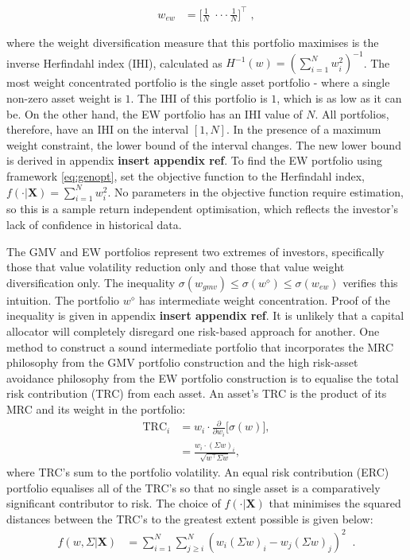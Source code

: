 \documentclass[
]{article}
\begin{document}
\begin{align}
w_{ew} & = \Big [\frac{1}{N} \; \cdot \cdot \cdot \frac{1}{N} \Big ]^\intercal \; ,
\end{align}

where the weight diversification measure that this portfolio maximises is the inverse Herfindahl index
(IHI), calculated as \(H^{-1} (w) = (\sum_{i = 1}^N w_i^2)^{-1}\). The most weight concentrated
portfolio is the single asset portfolio - where a single non-zero asset weight is \(1\). The IHI of this
portfolio is \(1\), which is as low as it can be. On the other hand, the EW portfolio has an IHI value
of \(N\). All portfolios, therefore, have an IHI on the interval \([1, N]\). In the presence of a maximum
weight constraint, the lower bound of the interval changes. The new lower bound is derived in appendix
\textbf{insert appendix ref}. To find the EW portfolio using framework \eqref{eq:genopt}, set the objective
function to the Herfindahl index, \(f(\cdot|\textbf{X}) = \sum_{i = 1}^N w_i^2\). No parameters in the
objective function require estimation, so this is a sample return independent optimisation, which
reflects the investor's lack of confidence in historical data.

The GMV and EW portfolios represent two extremes of investors, specifically those that value
volatility reduction only and those that value weight diversification only. The inequality
\(\sigma(w_{gmv}) \leq \sigma(w^\diamond) \leq \sigma(w_{ew})\) verifies this intuition. The portfolio
\(w^\diamond\) has intermediate weight concentration. Proof of the inequality is given in appendix
\textbf{insert appendix ref}. It is unlikely that a capital allocator will completely disregard one
risk-based approach for another. One method to construct a sound intermediate portfolio that
incorporates the MRC philosophy from the GMV portfolio construction and the high risk-asset avoidance
philosophy from the EW portfolio construction is to equalise the total risk contribution (TRC) from
each asset. An asset's TRC is the product of its MRC and its weight in the portfolio:
\begin{align*}
\text{TRC}_i &= w_i \cdot \frac{\partial}{\partial w_i} \Big [ \sigma(w)\Big ], \\
& = \frac{w_i \cdot (\Sigma w)_i}{\sqrt{w^\intercal \Sigma w}},
\end{align*}
where TRC's sum to the portfolio volatility. An equal risk contribution (ERC) portfolio equalises all
of the TRC's so that no single asset is a comparatively significant contributor to risk. The choice of
\(f(\cdot|\textbf{X})\) that minimises the squared distances between the TRC's to the greatest extent
possible is given below:
\begin{align}
f(w, \Sigma|\textbf{X}) &= \sum_{i = 1}^N  \sum_{j \geq i}^N(w_i(\Sigma w)_i - w_j(\Sigma w)_j)^2 \;\;  .
\end{align}
\end{document}
